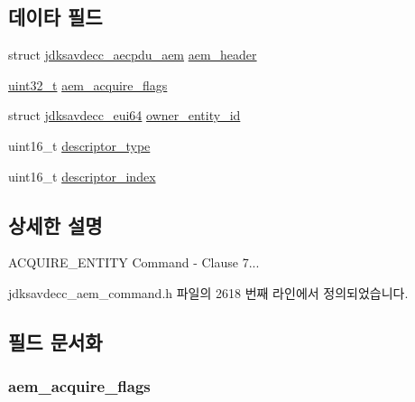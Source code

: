 \subsection*{데이타 필드}
\begin{DoxyCompactItemize}
\item 
struct \hyperlink{structjdksavdecc__aecpdu__aem}{jdksavdecc\+\_\+aecpdu\+\_\+aem} \hyperlink{structjdksavdecc__aem__command__acquire__entity_ae1e77ccb75ff5021ad923221eab38294}{aem\+\_\+header}
\item 
\hyperlink{parse_8c_a6eb1e68cc391dd753bc8ce896dbb8315}{uint32\+\_\+t} \hyperlink{structjdksavdecc__aem__command__acquire__entity_a1c1fa98ce0106469b3eff2aac33cea93}{aem\+\_\+acquire\+\_\+flags}
\item 
struct \hyperlink{structjdksavdecc__eui64}{jdksavdecc\+\_\+eui64} \hyperlink{structjdksavdecc__aem__command__acquire__entity_aae4e95a44a1a5e23f8e4415c32aed989}{owner\+\_\+entity\+\_\+id}
\item 
uint16\+\_\+t \hyperlink{structjdksavdecc__aem__command__acquire__entity_ab7c32b6c7131c13d4ea3b7ee2f09b78d}{descriptor\+\_\+type}
\item 
uint16\+\_\+t \hyperlink{structjdksavdecc__aem__command__acquire__entity_a042bbc76d835b82d27c1932431ee38d4}{descriptor\+\_\+index}
\end{DoxyCompactItemize}


\subsection{상세한 설명}
A\+C\+Q\+U\+I\+R\+E\+\_\+\+E\+N\+T\+I\+TY Command -\/ Clause 7... 

jdksavdecc\+\_\+aem\+\_\+command.\+h 파일의 2618 번째 라인에서 정의되었습니다.



\subsection{필드 문서화}
\subsubsection[{\texorpdfstring{aem\+\_\+acquire\+\_\+flags}{aem_acquire_flags}}]{ aem\+\_\+acquire\+\_\+flags}\hypertarget{structjdksavdecc__aem__command__acquire__entity_a1c1fa98ce0106469b3eff2aac33cea93}{}\label{structjdksavdecc__aem__command__acquire__entity_a1c1fa98ce0106469b3eff2aac33cea93}


